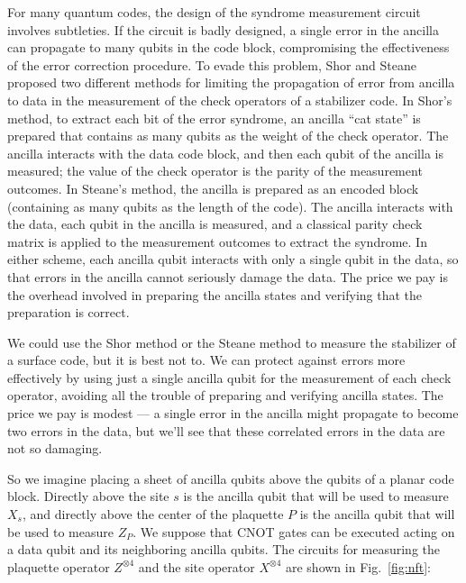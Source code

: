 For many quantum codes, the design of the syndrome measurement circuit involves subtleties. If the circuit is badly designed, a single error in the ancilla can propagate to many qubits in the code block, compromising the effectiveness of the error correction procedure. To evade this problem, Shor \cite{shor_ft} and Steane \cite{steane_anc} proposed two different methods for limiting the propagation of error from ancilla to data in the measurement of the check operators of a stabilizer code. In Shor's method, to extract each bit of the error syndrome, an ancilla ``cat state'' is prepared that contains as many qubits as the weight of the check operator. The ancilla interacts with the data code block, and then each qubit of the ancilla is measured; the value of the check operator is the parity of the measurement outcomes. In Steane's method, the ancilla is prepared as an encoded block (containing as many qubits as the length of the code). The ancilla interacts with the data, each qubit in the ancilla is measured, and a classical parity check matrix is applied to the measurement outcomes to extract the syndrome. In either scheme, each ancilla qubit interacts with only a single qubit in the data, so that errors in the ancilla cannot seriously damage the data. The price we pay is the overhead involved in preparing the ancilla states and verifying that the preparation is correct.

We could use the Shor method or the Steane method to measure the stabilizer of a surface code, but it is best not to. We can protect against errors more effectively by using just a single ancilla qubit for the measurement of each check operator, avoiding all the trouble of preparing and verifying ancilla states. The price we pay is modest --- a single error in the ancilla might propagate to become two errors in the data, but we'll see that these correlated errors in the data are not so damaging. 

So we imagine placing a sheet of ancilla qubits above the qubits of a planar code block. Directly above the site $s$ is the ancilla qubit that will be used to measure $X_s$, and directly above the center of the plaquette $P$ is the ancilla qubit that will be used to measure $Z_P$. We suppose that CNOT gates can be executed acting on a data qubit and its neighboring ancilla qubits. The circuits for measuring the plaquette operator $Z^{\otimes 4}$ and the site operator
$X^{\otimes 4}$ are shown in Fig.~\ref{fig:nft}:

